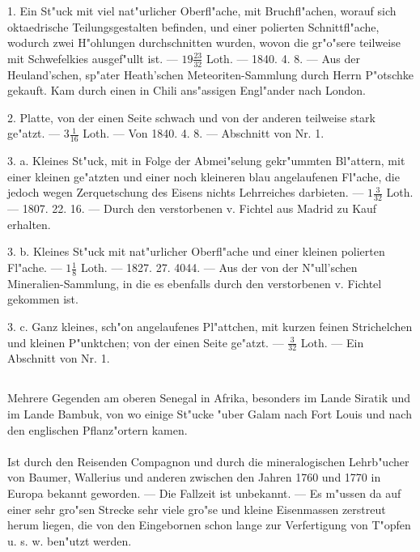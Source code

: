 \documentclass[a4paper, 11pt, oneside, polutonikogreek, german]{article}
\begin{document}
1. Ein St"uck mit viel nat"urlicher Oberfl"ache, mit Bruchfl"achen, worauf sich oktaedrische Teilungsgestalten befinden, und einer polierten Schnittfl"ache, wodurch zwei H"ohlungen durchschnitten wurden, wovon die gr"o"sere teilweise mit Schwefelkies ausgef"ullt ist. --- $19\frac{23}{32}$ Loth. --- 1840. 4. 8. --- Aus der Heuland'schen, sp"ater Heath'schen Meteoriten-Sammlung durch Herrn P"otschke gekauft. Kam durch einen in Chili ans"assigen Engl"ander nach London.

2. Platte, von der einen Seite schwach und von der anderen teilweise stark ge"atzt. --- $3\frac{1}{16}$ Loth. --- Von 1840. 4. 8. --- Abschnitt von Nr. 1.

3. a. Kleines St"uck, mit in Folge der Abmei"selung gekr"ummten Bl"attern, mit einer kleinen ge"atzten und einer noch kleineren blau angelaufenen Fl"ache, die jedoch wegen Zerquetschung des Eisens nichts Lehrreiches darbieten. --- $1\frac{3}{32}$ Loth. --- 1807. 22. 16. --- Durch den verstorbenen v. Fichtel aus Madrid zu Kauf erhalten.

3. b. Kleines St"uck mit nat"urlicher Oberfl"ache und einer kleinen polierten Fl"ache. --- $1\frac{1}{8}$ Loth. --- 1827. 27. 4044. --- Aus der von der N"ull'schen Mineralien-Sammlung, in die es ebenfalls durch den verstorbenen v. Fichtel gekommen ist.

3. c. Ganz kleines, sch"on angelaufenes Pl"attchen, mit kurzen feinen Strichelchen und kleinen P"unktchen; von der einen Seite ge"atzt. --- $\frac{3}{32}$ Loth. --- Ein Abschnitt von Nr. 1.
\subsection{}
\begin{center}

Mehrere Gegenden am oberen Senegal in Afrika, besonders im Lande Siratik und im Lande Bambuk, von wo einige St"ucke "uber Galam nach Fort Louis und nach den englischen Pflanz"ortern kamen.
\end{center}
\paragraph{}
Ist durch den Reisenden Compagnon und durch die mineralogischen Lehrb"ucher von Baumer, Wallerius und anderen zwischen den Jahren 1760 und 1770 in Europa bekannt geworden. --- Die Fallzeit ist unbekannt. --- Es m"ussen da auf einer sehr gro"sen Strecke sehr viele gro"se und kleine Eisenmassen zerstreut herum liegen, die von den Eingebornen schon lange zur Verfertigung von T"opfen u. s. w. ben"utzt werden.
\end{document}
